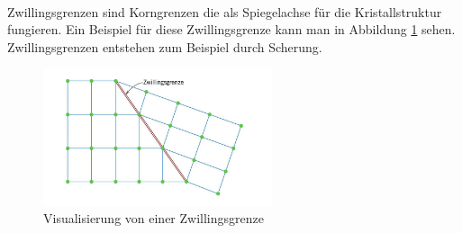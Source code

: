 \documentclass[11pt,a4paper]{article}
\numberwithin{equation}{section}
\numberwithin{figure}{section}
\begin{document}
\\
\begin{addmargin}[25pt]{0pt}    
Zwillingsgrenzen sind Korngrenzen die als Spiegelachse für die Kristallstruktur fungieren. Ein Beispiel für diese Zwillingsgrenze kann man in Abbildung \ref{fig:Zwillingsgrenze} sehen. Zwillingsgrenzen entstehen zum Beispiel durch Scherung. 
\begin{figure}[h]
    \centering
    \includegraphics[width = 0.6\textwidth]{images/Materialwissenschaften/Zwillingsgrenze.jpeg}
    \caption{Visualisierung von einer Zwillingsgrenze}
    \label{fig:Zwillingsgrenze}
\end{figure}\\
\end{addmargin}
\end{document}
